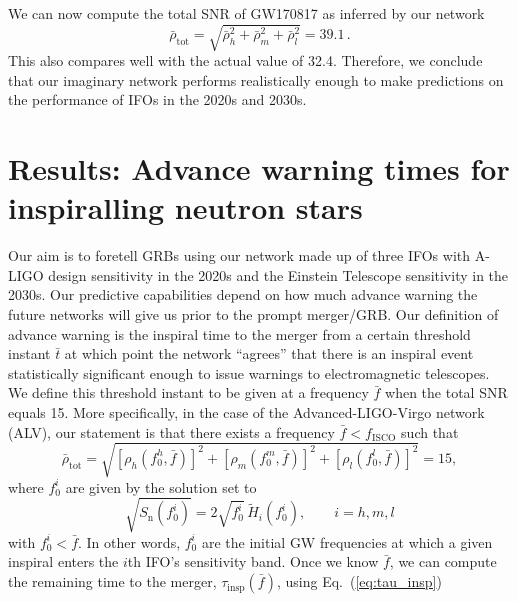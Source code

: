 \documentclass[11pt,a4paper]{article}
\newcommand{\f}{\frac}
\newcommand{\be}{\begin{equation}}
\newcommand{\ee}{\end{equation}}
\begin{document}
We can now compute the total SNR of GW170817 as inferred by our network
%
\be
\bar\rho_\text{tot}= \sqrt{\bar\rho^2_h+\bar\rho^2_m+\bar\rho^2_l}= 39.1 \, \label{eq:SNR_total_GW170817} .
\ee
%
This also compares well with the actual value of 32.4. Therefore, we conclude that our imaginary network performs realistically enough to make predictions on the performance of IFOs in the 2020s and 2030s.
%
%
%
%
%
\section{Results: Advance warning times for inspiralling neutron stars}\label{sec:results}
 Our aim is to foretell GRBs using our network made up of three IFOs with A-LIGO design sensitivity in the 2020s and the Einstein Telescope sensitivity in the 2030s.
 Our predictive capabilities depend on how much advance warning the future networks will give us prior to the prompt merger/GRB.
 Our definition of advance warning is the inspiral time to the merger from a certain threshold instant $\bar{t}$ at which point the network ``agrees'' that there is an inspiral 
 event statistically significant enough to issue warnings to electromagnetic telescopes.
 We define this threshold instant to be given at a frequency $\bar{f}$ when the total SNR equals 15. 
 More specifically, in the case of the Advanced-LIGO-Virgo network (ALV), our statement is that there exists a frequency $\bar{f} < f_\text{ISCO}$ such that
 \be
 \bar\rho_\text{tot}= \sqrt{\left[\rho_h(f_0^h,\bar{f})\right]^2+\left[\rho_m(f_0^m,\bar{f})\right]^2+\left[\rho_l(f_0^l,\bar{f})\right]^2}=15, \label{eq:SNR_bar}%
 \ee
 where $f_0^i$ are given by the solution set to
 \be
 \sqrt{S_\text{n}(f_0^i)} = 2\sqrt{f_0^i}\, \tilde{H}_i(f_0^i) \label{eq:f0},\qquad i=h,m,l
 \ee
 with $f_0^i < \bar{f}$. In other words, $f_0^i$ are the initial GW frequencies at which a given inspiral enters the $i$th IFO's sensitivity band. 
 Once we know $\bar{f}$, we can compute the remaining time to the merger, $\tau_\text{insp}(\bar{f})$, using Eq.~(\ref{eq:tau_insp})
\end{document}

